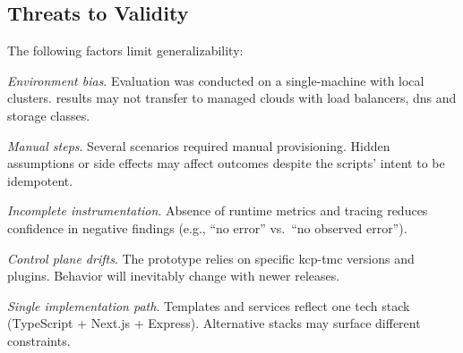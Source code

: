 \documentclass[11pt, a4paper, oneside, listof=totoc]{scrartcl}
\begin{document}
        \subsection{Threats to Validity}\label{subsec:evalThreatsToValidity}
            The following factors limit generalizability:
            \begin{enumerate}[label={[\arabic*]:},
                ref=Challenge~\arabic*,
                leftmargin=*,
                itemsep=0.6\baselineskip]

                \item\label{chal:evalValidityEnvironmentBias}
                    \textit{Environment bias}.
                    Evaluation was conducted on a single-machine with local clusters.
                    results may not transfer to managed clouds with load balancers, \gls{dns} and
                    storage classes.

                \item\label{chal:evalValidityPrototypeBias}
                    \textit{Manual steps}.
                    Several scenarios required manual provisioning.
                    Hidden assumptions or side effects may affect outcomes despite the scripts'
                    intent to be idempotent.

                \item\label{chal:evalValidityIncompleteInstrumentation}
                    \textit{Incomplete instrumentation}.
                    Absence of runtime metrics and tracing reduces confidence in negative findings
                    (e.g., \enquote{no error} vs.\ \enquote{no observed error}).

                \item\label{chal:evalValidityControlPlaneDrifts}
                    \textit{Control plane drifts}.
                    The prototype relies on specific \gls{kcp}-\gls{tmc} versions and plugins.
                    Behavior will inevitably change with newer releases.

                \item\label{chal:evalValiditySingleImplementationPath}
                    \textit{Single implementation path}.
                    Templates and services reflect one tech stack (TypeScript + Next.js + Express).
                    Alternative stacks may surface different constraints.
            \end{enumerate}
\end{document}
